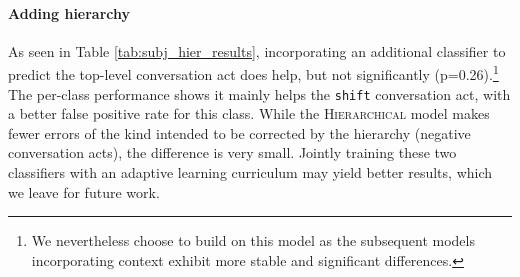 \paragraph{Adding hierarchy} As seen in Table \ref{tab:subj_hier_results}, incorporating an additional classifier to predict the top-level conversation act does help, but not significantly (p=0.26).\footnote{We nevertheless choose to build on this model as the subsequent models incorporating context exhibit more stable and significant differences.} The per-class performance shows it mainly helps the \texttt{shift} conversation act, with a better false positive rate for this class. While the \textsc{Hierarchical} model makes fewer errors of the kind intended to be corrected by the hierarchy (negative conversation acts), the difference is very small. Jointly training these two classifiers with an adaptive learning curriculum may yield better results, which we leave for future work.

\begin{table}[]
\centering
{}
\vspace{-.3em}
\caption{Overall and class-level macro-F1 on the test sets for models that incorporate context from the question and from the annotator. $^\ast$ indicates stat. sig., $\dagger$ not sig. vs. \textsc{Hierarchical}, and $\ddagger$ not stat. sig. vs. \textsc{+Question} or \textsc{+Annotator}.}
\label{tab:subj_context_results}
\end{table}

